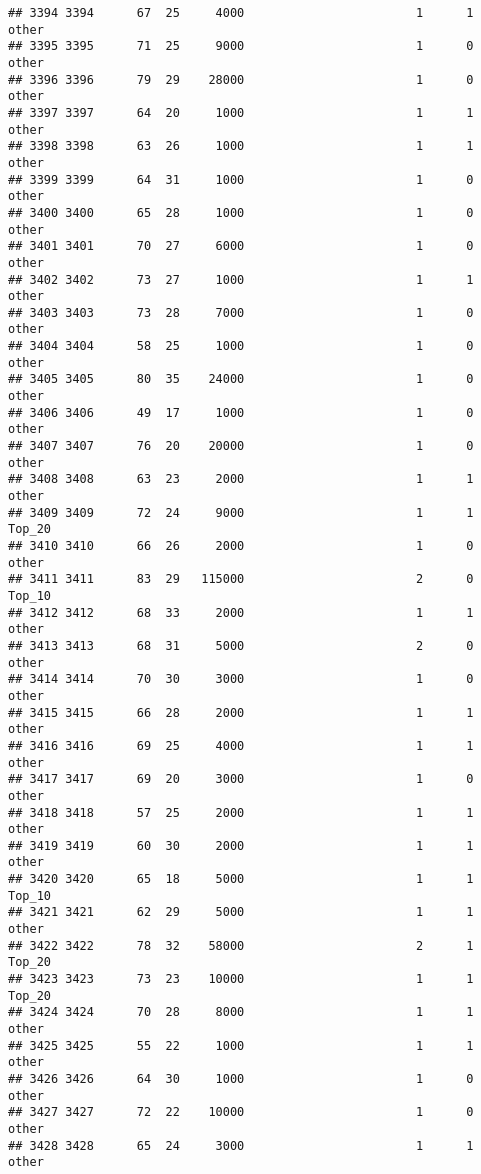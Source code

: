 \documentclass[
]{article}
\begin{document}
\begin{verbatim}
## 3394 3394      67  25     4000                        1      1    other
## 3395 3395      71  25     9000                        1      0    other
## 3396 3396      79  29    28000                        1      0    other
## 3397 3397      64  20     1000                        1      1    other
## 3398 3398      63  26     1000                        1      1    other
## 3399 3399      64  31     1000                        1      0    other
## 3400 3400      65  28     1000                        1      0    other
## 3401 3401      70  27     6000                        1      0    other
## 3402 3402      73  27     1000                        1      1    other
## 3403 3403      73  28     7000                        1      0    other
## 3404 3404      58  25     1000                        1      0    other
## 3405 3405      80  35    24000                        1      0    other
## 3406 3406      49  17     1000                        1      0    other
## 3407 3407      76  20    20000                        1      0    other
## 3408 3408      63  23     2000                        1      1    other
## 3409 3409      72  24     9000                        1      1   Top_20
## 3410 3410      66  26     2000                        1      0    other
## 3411 3411      83  29   115000                        2      0   Top_10
## 3412 3412      68  33     2000                        1      1    other
## 3413 3413      68  31     5000                        2      0    other
## 3414 3414      70  30     3000                        1      0    other
## 3415 3415      66  28     2000                        1      1    other
## 3416 3416      69  25     4000                        1      1    other
## 3417 3417      69  20     3000                        1      0    other
## 3418 3418      57  25     2000                        1      1    other
## 3419 3419      60  30     2000                        1      1    other
## 3420 3420      65  18     5000                        1      1   Top_10
## 3421 3421      62  29     5000                        1      1    other
## 3422 3422      78  32    58000                        2      1   Top_20
## 3423 3423      73  23    10000                        1      1   Top_20
## 3424 3424      70  28     8000                        1      1    other
## 3425 3425      55  22     1000                        1      1    other
## 3426 3426      64  30     1000                        1      0    other
## 3427 3427      72  22    10000                        1      0    other
## 3428 3428      65  24     3000                        1      1    other

\end{verbatim}
\end{document}
